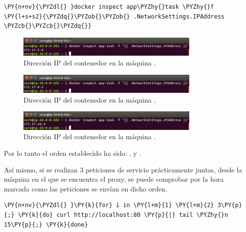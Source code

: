 \begin{framed_shaded}
\begin{Verbatim}[fontsize=\relsize{-2.5},fontseries=b,commandchars=\\\{\}]
\PY{n+nv}{\PYZdl{} }docker inspect app\PYZhy{}task \PYZhy{}f \PY{l+s+s2}{\PYZdq{}\PYZob{}\PYZob{} .NetworkSettings.IPAddress \PYZcb{}\PYZcb{}\PYZdq{}}
\end{Verbatim}
\end{framed_shaded}

\begin{figure}[H]
\centering
\includegraphics[width=0.8\textwidth]{images/figures/IP1-confd.png}
\caption{Dirección IP del contenedor  en la máquina .}
\end{figure}

\begin{figure}[H]
\centering
\includegraphics[width=0.8\textwidth]{images/figures/IP2-confd.png}
\caption{Dirección IP del contenedor  en la máquina .}
\end{figure}

\begin{figure}[H]
\centering
\includegraphics[width=0.8\textwidth]{images/figures/IP3-confd.png}
\caption{Dirección IP del contenedor  en la máquina .}
\end{figure}

Por lo tanto el orden establecido ha sido: ,  y .

Así mismo, si se realizan 3 peticiones de servicio prácticamente juntas, desde la máquina  en el que se encuentra el proxy, se puede comprobar por la hora marcada como las peticiones se envían en dicho orden.

\begin{framed_shaded}
\begin{Verbatim}[fontsize=\relsize{-2.5},fontseries=b,commandchars=\\\{\}]
\PY{n+nv}{\PYZdl{} }\PY{k}{for} i in \PY{l+m}{1} \PY{l+m}{2} 3\PY{p}{;} \PY{k}{do} curl http://localhost:80 \PY{p}{|} tail \PYZhy{}n 15\PY{p}{;} \PY{k}{done}
\end{Verbatim}
\end{framed_shaded}

